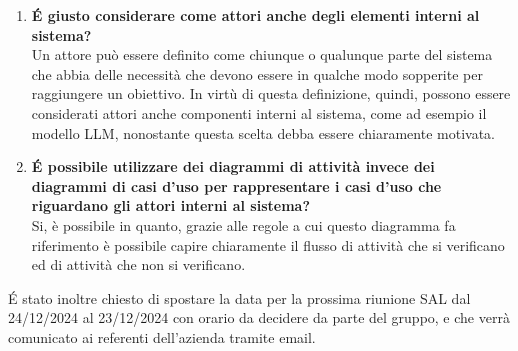 \begin{enumerate}
\begin{enumerate}[label=\Alph*)]
        In questo caso si potrebbe evitare di creare l'alternativa testuale, ma sarebbe più complesso gestire il reperimento delle immagini nel database. Una possibilità per la gestione di questa problematica potrebbe essere inserire in linguaggio naturale un contesto iniziale da passare al modello per istruirlo a svolgere questa operazione di ricerca dell'immagine oltre alle informazioni testuali. Viene comunque consigliato di analizzare per gradi il problema dell'embedding delle immagini e di trasciurarlo per il momento in favore dell'embedding del testo, ritenuto più importante e semplice al momento.
        \item \textbf{\'E giusto considerare come attori anche degli elementi interni al sistema?}\\
        Un attore può essere definito come chiunque o qualunque parte del sistema che abbia delle necessità che devono essere in qualche modo sopperite per raggiungere un obiettivo. In virtù di questa definizione, quindi, possono essere considerati attori anche componenti interni al sistema, come ad esempio il modello LLM, nonostante questa scelta debba essere chiaramente motivata.
        \item \textbf{\'E possibile utilizzare dei diagrammi di attività invece dei diagrammi di casi d'uso per rappresentare i casi d'uso che riguardano gli attori interni al sistema?}\\
        Si, è possibile in quanto, grazie alle regole a cui questo diagramma fa riferimento è possibile capire chiaramente il flusso di attività che si verificano ed di attività che non si verificano.
    \end{enumerate}
    \'E stato inoltre chiesto di spostare la data per la prossima riunione SAL dal 24/12/2024 al 23/12/2024 con orario da decidere da parte del gruppo, e che verrà comunicato ai referenti dell'azienda tramite email.
\end{enumerate}